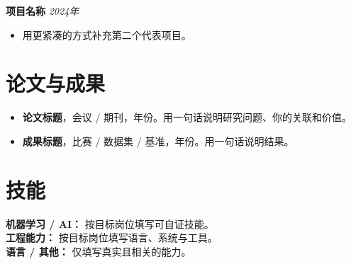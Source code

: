\documentclass[UTF8,a4paper,11pt]{ctexart}
\newcommand{\cvneedspace}[1]{%
  \par\ifdim\dimexpr\pagegoal-\pagetotal\relax<#1\relax\newpage\fi
}
\newcommand{\cvsection}[1]{\cvneedspace{4\baselineskip}\section{#1}}
\begin{document}
\cvneedspace{4\baselineskip}
\textbf{项目名称} \hfill \textit{2024年}\\
{\small
\begin{itemize}[leftmargin=1.2em,itemsep=2pt,topsep=3pt]
  \item 用更紧凑的方式补充第二个代表项目。
\end{itemize}
}

\cvsection{论文与成果}
{\small
\begin{itemize}[leftmargin=1.2em,itemsep=2pt,topsep=3pt]
  \item \textbf{论文标题}，会议 / 期刊，年份。用一句话说明研究问题、你的关联和价值。
  \item \textbf{成果标题}，比赛 / 数据集 / 基准，年份。用一句话说明结果。
\end{itemize}
}

\cvsection{技能}
\textbf{机器学习 / AI：} 按目标岗位填写可自证技能。\\
\textbf{工程能力：} 按目标岗位填写语言、系统与工具。\\
\textbf{语言 / 其他：} 仅填写真实且相关的能力。
\end{document}
